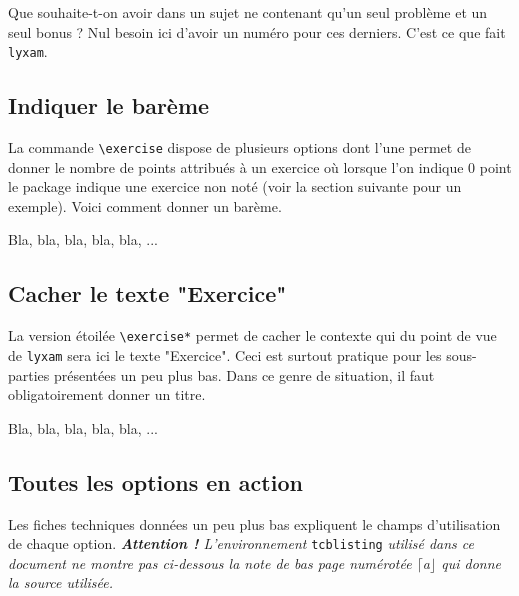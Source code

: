\documentclass[12pt,a4paper]{scrartcl}
\makeatletter
\theoremstyle{definition}
\newcommand\resetallcnt{
    	\setcounter{lyxam@counter@topic}{0}
    	\setcounter{lyxam@counter@exercise}{0}
    	\setcounter{lyxam@counter@problem}{0}
    	\setcounter{lyxam@counter@bonus}{0}
    	\setcounter{lyxam@counter@subpart}{0}
    }
\makeatother
\begin{document}
Que souhaite-t-on avoir dans un sujet ne contenant qu'un seul problème et un seul bonus ? Nul besoin ici d'avoir un numéro pour ces derniers. C'est ce que fait \verb+lyxam+.

\resetallcnt{}

\begin{tcblisting}{}
\exercise
\exercise
\problem
\bonus
\end{tcblisting}



    \subsection{Indiquer le barème}

La commande \verb+\exercise+ dispose de plusieurs options dont l'une permet de donner le nombre de points attribués à un exercice où lorsque l'on indique $0$ point le package indique une exercice non noté (voir la section suivante pour un exemple). Voici comment donner un barème.

\resetallcnt{}

\begin{tcblisting}{}
\exercise[pts = 5]
Bla, bla, bla, bla, bla, ...
\end{tcblisting}


    \subsection{Cacher le texte "Exercice"}

La version étoilée \verb+\exercise*+ permet de cacher le contexte qui du point de vue de \verb+lyxam+ sera ici le texte "Exercice". Ceci est surtout pratique pour les sous-parties présentées un peu plus bas. Dans ce genre de situation, il faut obligatoirement donner un titre.

\begin{tcblisting}{}
\exercise*[title = Juste mon titre]

Bla, bla, bla, bla, bla, ...
\end{tcblisting}


    \subsection{Toutes les options en action}

Les fiches techniques données un peu plus bas expliquent le champs d'utilisation de chaque option.
\textit{\textbf{Attention !} L'environnement} \verb+tcblisting+ \textit{utilisé dans ce document ne montre pas ci-dessous la note de bas page numérotée $\lceil$a$\rfloor$ qui donne la source utilisée.}
\end{document}
